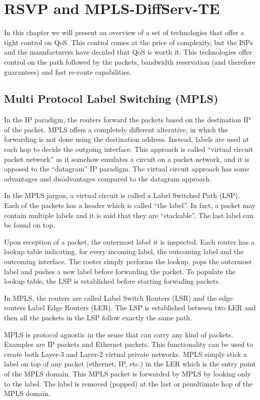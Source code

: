 \chapter{RSVP and MPLS-DiffServ-TE}

In this chapter we will present an overview of a set of technologies that offer a tight control on QoS.
This control comes at the price of complexity, but the ISPs and the manufacturers have decided that QoS is worth it.
This technologies offer control on the path followed by the packets, bandwidth reservation (and therefore guarantees) and fast re-route capabilities.

\section{Multi Protocol Label Switching (MPLS)}

In the IP paradigm, the routers forward the packets based on the destination IP of the packet.
MPLS offers a completely different alterative, in which the forwarding is not done using the destination address.
Instead, labels are used at each hop to decide the outgoing interface.
This approach is called ``virtual circuit packet network'' as it somehow emulates a circuit on a packet network, and it is opposed to the ``datagram'' IP paradigm.
The virtual circuit approach has some advantages and disadvantages compared to the datagram approach.

In the MPLS jargon, a virtual circuit is called a Label Switched Path (LSP).
Each of the packets has a header which is called ``the label''.
In fact, a packet may contain multiple labels and it is said that they are ``stackable''.
The last label can be found on top.

Upon reception of a packet, the outermost label it is inspected.
Each router has a lookup table indicating, for every incoming label, the outcoming label and the outcoming interface.
The rooter simply performs the lookup, pops the outermost label and pushes a new label before forwarding the packet.
To populate the lookup table, the LSP is established before starting forwading packets.

In MPLS, the routers are called Label Switch Routers (LSR) and the edge routers Label Edge Routers (LER).
The LSP is established between two LER and then all the packets in the LSP follow exactly the same path.

MPLS is protocol agnostic in the sense that can carry any kind of packets.
Examples are IP packets and Ethernet packets.
This functionality can be used to create both Layer-3 and Layer-2 virtual private networks.
MPLS simply stick a label on top of any packet (ethernet, IP, etc.)  in the LER which is the entry point of the MPLS domain.
This MPLS packet is forwarded by MPLS by looking only to the label.
The label is removed (popped) at the last or penultimate hop of the MPLS domain.

